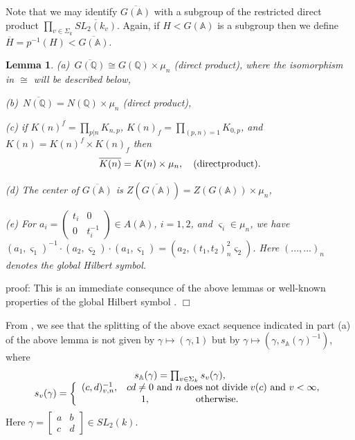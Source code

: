 \documentclass[12pt]{article}
\numberwithin{equation}{section}
\newtheorem{lemma}[theorem]{Lemma}
\def\aaa{\mathbb{A}}
\def\qqq{\mathbb{Q}}
\begin{document}
Note that we may identify $\overline{G(\aaa )}$ with a subgroup of the
restricted direct product
$\prod_{v\in \Sigma _k}\overline{SL_2(k_v)}$. Again,
if $H<G(\aaa )$ is a subgroup then we define
$\overline{H}=p^{-1}(H)<\overline{G(\aaa )}$.

\begin{lemma}\label{lem:2.6}
(a)\ $\overline{G(\qqq)}\cong G(\qqq)\times \mu _n$
(direct product), where the isomorphism in $\cong$ will be
described below,

(b)\ $\overline{N(\qqq)}=N(\qqq)\times \mu _n$ (direct product),

(c) if $K(n)^f=\prod_{p|n}K_{n,p}$, $K(n)_f=\prod_{(p,n)=1}K_{0,p}$, and
$K(n)=K(n)^f\times K(n)_f$ then 
\[
\overline{K(n)}=K(n)\times \mu _n,
\ \ \ {\rm (direct product)}.
\]

(d) The center of $\overline{G(\aaa )}$ is
$Z(\overline{G(\aaa )})=Z(G({\aaa }))\times \mu _n$,

(e) For $a_i=\left( 
\begin{array}{cc}
t_i & 0 \\ 
0 & t_i^{-1}
\end{array}
\right) \in A(\aaa )$, $i=1,2$, and $\varsigma _i\in \mu _n$, we have $%
(a_1,\varsigma _1)^{-1}\cdot (a_2,\varsigma _2)\cdot (a_1,\varsigma
_1)=(a_2,(t_1,t_2)_n^2\varsigma _2)$. Here $(...,...)_n$ denotes the global
Hilbert symbol.
\end{lemma}

proof: This is an immediate consequnce of the above lemmas or well-known
properties of the global Hilbert symbol \cite{W1}. $\Box $

From \cite{K2}, we see that
the splitting of the above exact sequence indicated in part (a) of the above
lemma is not given by $\gamma \longmapsto (\gamma ,1)$ but by $\gamma
\longmapsto (\gamma ,s_{\aaa }(\gamma )^{-1})$, where 
\begin{equation}\label{eq:2.9}
\begin{array}{c}
s_{\aaa }(\gamma )=
\prod_{v\in \Sigma _k}
s_v(\gamma),\\
s_v(\gamma)=\left\{ 
\begin{array}{c}
(c,d)_{v,n}^{-1},
\;\;\;cd\neq 0{\rm \ and\ }
n\;\mathrm{does\;not\;divide}\;v(c)
{\rm \ and\ }v<\infty, \\ 
1,\;\;\;\;\;\;\;\;\;\;\;\;\;\;\;\;
\mathrm{\;otherwise}.\;\;\;\;\;\;\;\;
\end{array}
\right.
\end{array}
\end{equation}
Here $\gamma =\left[ 
\begin{array}{cc}
a & b \\ 
c & d
\end{array}
\right] \in SL_2(k)$.
\end{document}
